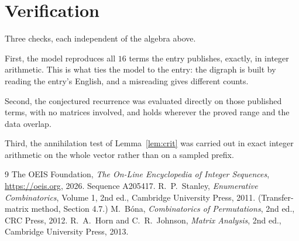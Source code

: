 \documentclass[11pt,a4paper]{article}
\theoremstyle{plain}
\theoremstyle{definition}
\begin{document}
\section{Verification}

Three checks, each independent of the algebra above.

First, the model reproduces all $16$ terms the entry publishes, exactly, in integer
arithmetic. This is what ties the model to the entry: the digraph is built by reading the
entry's English, and a misreading gives different counts.

Second, the conjectured recurrence was evaluated directly on those published terms, with no
matrices involved, and holds wherever the proved range and the data overlap.

Third, the annihilation test of Lemma~\ref{lem:crit} was carried out in exact integer
arithmetic on the whole vector rather than on a sampled prefix.

\begin{thebibliography}{9}
 The OEIS Foundation, \emph{The On-Line Encyclopedia of Integer
Sequences}, \url{https://oeis.org}, 2026. Sequence A205417.
 R.~P.~Stanley, \emph{Enumerative Combinatorics}, Volume 1, 2nd ed.,
Cambridge University Press, 2011. (Transfer-matrix method, Section 4.7.)
 M.~B\'ona, \emph{Combinatorics of Permutations}, 2nd ed., CRC
Press, 2012.
 R.~A.~Horn and C.~R.~Johnson, \emph{Matrix Analysis}, 2nd ed., Cambridge
University Press, 2013.
\end{thebibliography}
\end{document}

